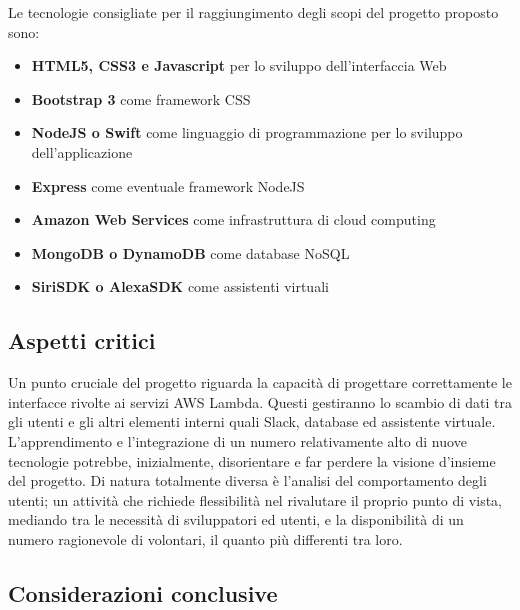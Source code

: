Le tecnologie consigliate per il raggiungimento degli scopi del progetto
proposto sono:
\begin{itemize}
	\item \textbf{HTML5, CSS3 e Javascript }per lo sviluppo dell'interfaccia
	Web
	\item \textbf{Bootstrap 3} come framework CSS
	\item \textbf{NodeJS o Swift} come linguaggio di programmazione per lo
	sviluppo dell'applicazione
	\item \textbf{Express} come eventuale framework NodeJS
	\item \textbf{Amazon Web Services }come infrastruttura di cloud computing
	\item \textbf{MongoDB o DynamoDB} come database NoSQL
	\item \textbf{SiriSDK o AlexaSDK} come assistenti virtuali
\end{itemize}

\subsection{Aspetti critici}

Un punto cruciale del progetto riguarda la capacità di progettare
correttamente le interfacce rivolte ai servizi AWS Lambda. Questi
gestiranno lo scambio di dati tra gli utenti e gli altri elementi
interni quali Slack, database ed assistente virtuale. L'apprendimento e l'integrazione di un numero relativamente alto di nuove tecnologie potrebbe, inizialmente, disorientare e far perdere la visione d'insieme del progetto.
Di natura totalmente diversa è l'analisi del comportamento degli
utenti; un attività che richiede flessibilità nel rivalutare il proprio
punto di vista, mediando tra le necessità di sviluppatori ed utenti,
e la disponibilità di un numero ragionevole di volontari, il quanto più differenti tra loro.

\subsection{Considerazioni conclusive}

